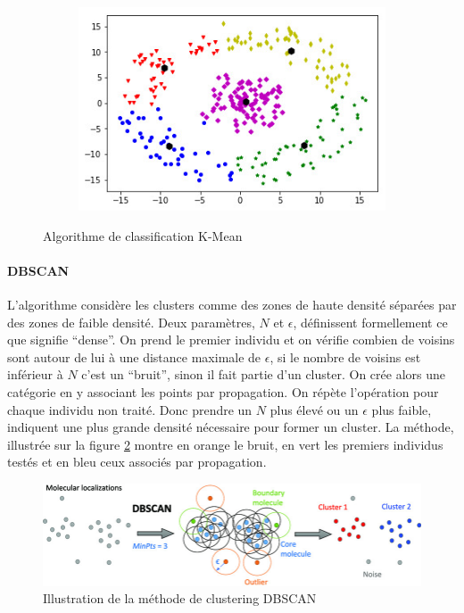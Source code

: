 \documentclass[../thesis.tex]{subfiles}
\begin{document}
\begin{figure}[H]
\begin{subfigure}[b]{0.3\textwidth}
            \includegraphics[width=\linewidth]{img/biblio/classification-kmean-4}
        \end{subfigure}
        \caption{Algorithme de classification K-Mean}
        \label{fig:03-classification-kmean-2}
    \end{figure}
    \vspace{-0.5em}
    
    \paragraph{DBSCAN} L'algorithme considère les clusters comme des zones de haute densité séparées par des zones de faible densité. Deux paramètres, $N$ et $\epsilon$, définissent formellement ce que signifie ``dense''. On prend le premier individu et on vérifie combien de voisins sont autour de lui à une distance maximale de $\epsilon$, si le nombre de voisins est inférieur à $N$ c'est un ``bruit'', sinon il fait partie d'un cluster. On crée alors une catégorie en y associant les points par propagation. On répète l'opération pour chaque individu non traité. Donc prendre un $N$ plus élevé ou un $\epsilon$ plus faible, indiquent une plus grande densité nécessaire pour former un cluster. La méthode, illustrée sur la figure \ref{fig:03-classification-dbscan} montre en orange le bruit, en vert les premiers individus testés et en bleu ceux associés par propagation.
    
    \begin{figure}[H]
        \centering
        \includegraphics[width=0.7\linewidth]{img/biblio/classification-dbscan}
        \caption{Illustration de la méthode de clustering DBSCAN}
        \label{fig:03-classification-dbscan}
    \end{figure}
    
\end{document}
